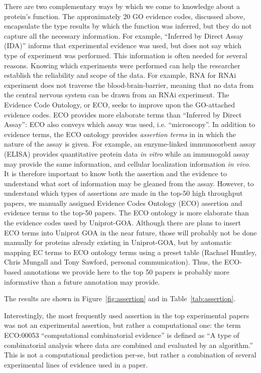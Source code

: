 \documentclass[12pt]{article}
\begin{document}
There are two complementary ways by which we come to knowledge about a protein's function. The
approximately 20 GO evidence codes, discussed above, encapsulate the type results by which the
function was inferred, but they do not capture all the necessary information. For example,
``Inferred by Direct Assay (IDA)'' informs that experimental evidence was used, but does not say
which type of experiment was performed. This information is often needed for several reasons.
Knowing which experiments were performed can help the researcher establish the reliability and
scope of the data. For example, RNA for RNAi experiment does not traverse the
blood-brain-barrier, meaning that no data from the central nervous system can be drawn from an
RNAi experiment. The Evidence Code Ontology, or ECO, seeks to improve upon the GO-attached
evidence codes. ECO provides more elaborate terms than ``Inferred by Direct Assay'': ECO also
conveys which assay was used, i.e.  ``microscopy''.  In addition to evidence terms, the ECO
ontology provides \textit{assertion terms} in in which the nature of the assay is given. For
example, an enzyme-linked immunosorbent assay (ELISA) provides quantitative protein data
\textit{in vitro} while an immunogold assay may provide the same information, and cellular
localization information \textit{in vivo}. It is therefore important to know both the assertion
and the evidence to understand what sort of information may be gleaned from the assay.  However,
to understand which types of assertions are made in the top-50 high throughput papers, we
manually assigned Evidence Codes Ontology (ECO) assertion and evidence terms to the
top-50 papers. The ECO ontology is more elaborate than the evidence codes used by Uniprot-GOA.
Although there are plans to insert ECO terms into Uniprot GOA in the near future, those will
probably not be done manually for proteins already existing in Uniprot-GOA, but by automatic
mapping EC terms to ECO ontology terms using a preset table (Rachael Huntley, Chris Mungall  and
Tony Sawford, personal communication). Thus, the ECO-based annotations we provide here to the top
50 papers is probably more informative than a future annotation may provide.

The results are shown in Figure~\ref{fig:assertion} and in
Table~\ref{tab:assertion}.

Interestingly, the most frequently used assertion in the top experimental papers was not an
experimental assertion, but rather a computational one: the term ECO:00053 ``computational
combinatorial evidence'' is defined as ``A type of combinatorial analysis where data are
combined and evaluated by an algorithm.'' This is not a computational prediction per-se, but
rather a combination of several experimental lines of evidence used in a paper. 
\end{document}
